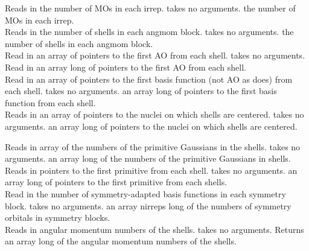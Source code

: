 \noindent {}
{Reads in the number of MOs in each irrep.}
{takes no arguments.}
{the number of MOs in each irrep.} \\

\noindent {}
{Reads in the number of shells in each angmom block.}
{takes no arguments.}
{the number of shells in each angmom block.} \\

\noindent {}
{Read in an array of pointers to the first AO
from each shell.}
{takes no arguments.}
{Read in an array  long of pointers to
the first AO from each shell.} \\

\noindent {}
{Read in an array of pointers to the first basis
function (not AO as  does)
from each shell.}
{takes no arguments.}
{an array  long of pointers to
the first basis function from each shell.} \\

\noindent {}
{Reads in an array of pointers to the nuclei on which shells are centered.}
{takes no arguments.}
{an array  long of pointers to the nuclei on which shells
are centered.}

\noindent {}
{Reads in array of the numbers of the primitive
Gaussians in the shells.}
{takes no arguments.}
{an array  long of the numbers of 
the primitive Gaussians in shells.} \\

\noindent {}
{Reads in pointers to the first primitive
from each shell.}
{takes no arguments.}
{an array  long of pointers to the first 
primitive from each shells.} \\

\noindent {}
{Read in the number of symmetry-adapted basis functions in each symmetry block.}
{takes no arguments.}
{an array nirreps long of the numbers of
symmetry orbitals in symmetry blocks.} \\

\noindent {}
{Reads in angular momentum numbers of
the shells.}
{takes no arguments.}
{Returns an array  long of
the angular momentum numbers of the shells.} \\


